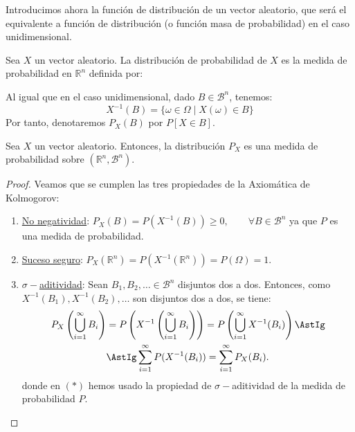 Introducimos ahora la función de distribución de un vector aleatorio, que será el equivalente a función de distribución (o función masa de probabilidad) en el caso unidimensional.
\begin{definicion}
    Sea $X$ un vector aleatorio. La distribución de probabilidad de $X$ es la medida de probabilidad en $\mathbb{R}^n$ definida por:
\end{definicion}

\begin{notacion}
    Al igual que en el caso unidimensional, dado $B\in \mathcal{B}^n$, tenemos:
    \begin{equation*}
        X^{-1}(B) = \{\omega\in \Omega \mid X(\omega)\in B\}
    \end{equation*}
    Por tanto, denotaremos $P_X(B)$ por $P[X\in B]$.
\end{notacion}

\begin{prop}
    Sea $X$ un vector aleatorio. Entonces, la distribución $P_X$ es una medida de probabilidad sobre $(\mathbb{R}^n, \mathcal{B}^n)$.
\end{prop}
\begin{proof} Veamos que se cumplen las tres propiedades de la Axiomática de Kolmogorov:
    \begin{enumerate}
        \item \ul{No negatividad}: $P_X(B) = P(X^{-1}(B)) \geq 0,\qquad \forall B\in \mathcal{B}^n$ ya que $P$ es una medida de probabilidad.
        \item \ul{Suceso seguro}: $P_X(\mathbb{R}^n) = P(X^{-1}(\mathbb{R}^n)) = P(\Omega) = 1$.
        \item \ul{$\sigma-$aditividad}: Sean $B_1, B_2, \ldots \in \mathcal{B}^n$ disjuntos dos a dos. Entonces, como $X^{-1}(B_1), X^{-1}(B_2), \ldots$ son disjuntos dos a dos, se tiene:
        \begin{align*}
            P_X\left(\bigcup_{i=1}^\infty B_i\right) &= P\left(X^{-1}\left(\bigcup_{i=1}^\infty B_i\right)\right) = P\left(\bigcup_{i=1}^\infty X^{-1}(B_i)\right)\AstIg\\
            &\AstIg \sum_{i=1}^\infty P(X^{-1}(B_i)) = \sum_{i=1}^\infty P_X(B_i).
        \end{align*}
        donde en $(\ast)$ hemos usado la propiedad de $\sigma-$aditividad de la medida de probabilidad $P$.
    \end{enumerate}
\end{proof}


